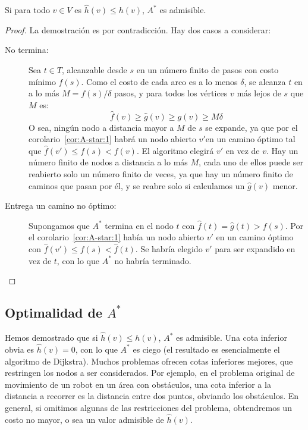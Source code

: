   \begin{theorem}
    \label{theo:A-star:admisible}
    Si para todo \(v \in V\) es \(\widehat{h}(v) \le h(v)\),
    \(A^*\) es admisible.
  \end{theorem}
  \begin{proof}
    La demostración es por contradicción.
    Hay dos casos a considerar:
    \begin{description}
    \item[No termina:]
      Sea \(t \in T\),
      alcanzable desde \(s\) en un número finito de pasos
      con costo mínimo \(f(s)\).
      Como el costo de cada arco es a lo menos \(\delta\),
      se alcanza \(t\) en a lo más \(M = f(s) / \delta\) pasos,
      y para todos los vértices \(v\)
      más lejos de \(s\) que \(M\) es:
      \begin{equation*}
        \widehat{f}(v)
          \ge \widehat{g}(v)
          \ge g(v)
          \ge M \delta
      \end{equation*}
      O sea,
      ningún nodo a distancia mayor a \(M\) de \(s\) se expande,
      ya que por el corolario~\ref{cor:A-star:1}
      habrá un nodo abierto \(v'\)en un camino óptimo
      tal que \(\widehat{f}(v') \le f(s) < f(v)\).
      El algoritmo elegirá \(v'\) en vez de \(v\).
      Hay un número finito de nodos a distancia a lo más \(M\),
      cada uno de ellos puede ser reabierto solo un número finito de veces,
      ya que hay un número finito de caminos que pasan por él,
      y se reabre solo si calculamos un \(\widehat{g}(v)\) menor.
    \item[Entrega un camino no óptimo:]
      Supongamos que \(A^*\) termina en el nodo \(t\)
      con \(\widehat{f}(t) = \widehat{g}(t) > f(s)\).
      Por el corolario~\ref{cor:A-star:1}
      había un nodo abierto \(v'\) en un camino óptimo
      con \(\widehat{f}(v') \le f(s) < \widehat{f}(t)\).
      Se habría elegido \(v'\) para ser expandido en vez de \(t\),
      con lo que \(A^*\) no habría terminado.
    \end{description}
    \qedhere
  \end{proof}

\subsection{Optimalidad de \(A^*\)}
\label{sec:A-star:optimo}

  Hemos demostrado que si \(\widehat{h}(v) \le h(v)\),
  \(A^*\) es admisible.
  Una cota inferior obvia es \(\widehat{h}(v) = 0\),
  con lo que \(A^*\) es ciego
  (el resultado es esencialmente el algoritmo de Dijkstra).
  Muchos problemas ofrecen cotas inferiores mejores,
  que restringen los nodos a ser considerados.
  Por ejemplo,
  en el problema original de movimiento de un robot en un área con obstáculos,
  una cota inferior a la distancia a recorrer
  es la distancia entre dos puntos,
  obviando los obstáculos.
  En general,
  si omitimos algunas de las restricciones del problema,
  obtendremos un costo no mayor,
  o sea un valor admisible de \(\widehat{h}(v)\).

